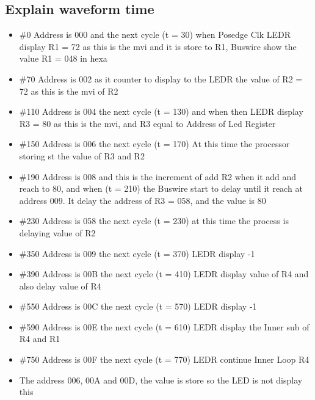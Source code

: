 \subsection{Explain waveform time}
\begin{itemize}
    \item \#0 Address is 000 and the next cycle (t = 30) when Posedge Clk LEDR display R1 = 72 as this is the mvi and it is store to R1, Buswire show the value R1 = 048 in hexa
    \item \#70 Address is 002 as it counter to display to the LEDR the value of R2 = 72 as this is the mvi of R2
    \item \#110 Address is 004 the next cycle (t = 130) and when then LEDR display R3 = 80 as this is the mvi, and R3 equal to Address of Led Register
    \item \#150 Address is 006 the next cycle (t = 170) At this time the processor storing st the value of R3 and R2
    \item \#190 Address is 008 and this is the increment of add R2 when it add and reach to 80, and when (t = 210) the Buswire start to delay until it reach at address 009. It delay the address of R3 = 058, and the value is 80
    \item \#230 Address is 058 the next cycle (t = 230) at this time the process is delaying value of R2
    \item \#350 Address is 009 the next cycle (t = 370) LEDR display -1
    \item \#390 Address is 00B  the next cycle (t = 410) LEDR display value of R4 and also delay value of R4
    \item \#550 Address is 00C the next cycle (t = 570) LEDR display -1
    \item \#590 Address is 00E the next cycle (t = 610) LEDR display the Inner sub of R4 and R1
    \item \#750 Address is 00F the next cycle (t = 770) LEDR continue Inner Loop R4
    \item The address 006, 00A and 00D, the value is store so the LED is not display this
\end{itemize}
